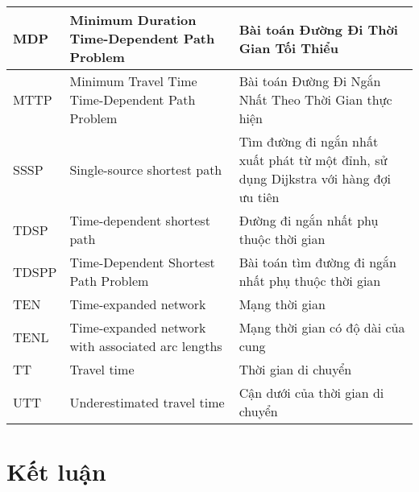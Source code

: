 \documentclass[fontsize=14pt,DIV=15pt,twoside=false]{scrbook}
\newcommand{\toc}[0]{
\tableofcontents
\listoffigures
\listoftables
}
\begin{document}
\begin{table}[h]
\begin{tabularx}{\textwidth}{|p{1.5cm}|X|X|}
    MDP              & Minimum Duration Time-Dependent Path Problem      & Bài toán Đường Đi Thời Gian Tối Thiểu                                               \\ \midrule
    MTTP             & Minimum Travel Time Time-Dependent Path Problem   & Bài toán Đường Đi Ngắn Nhất Theo Thời Gian thực hiện                                \\ \midrule
    SSSP             & Single-source shortest path                       & Tìm đường đi ngắn nhất xuất phát từ một đỉnh, sử dụng Dijkstra với hàng đợi ưu tiên \\ \midrule
    TDSP             & Time-dependent shortest path                      & Đường đi ngắn nhất phụ thuộc thời gian                                              \\ \midrule
    TDSPP            & Time-Dependent Shortest Path Problem              & Bài toán tìm đường đi ngắn nhất phụ thuộc thời gian                                 \\ \midrule
    TEN              & Time-expanded network                             & Mạng thời gian                                                                      \\ \midrule
    TENL             & Time-expanded network with associated arc lengths & Mạng thời gian có độ dài của cung                                                   \\ \midrule
    TT               & Travel time                                       & Thời gian di chuyển                                                                 \\ \midrule
    UTT              & Underestimated travel time                        & Cận dưới của thời gian di chuyển                                                    \\ \bottomrule
    \end{tabularx}
\end{table}

\toc

%
%
%
%

\chapter*{Kết luận}\label{kux1ebft-luux1eadn}


\printbibliography
%

\backmatter
\end{document}
